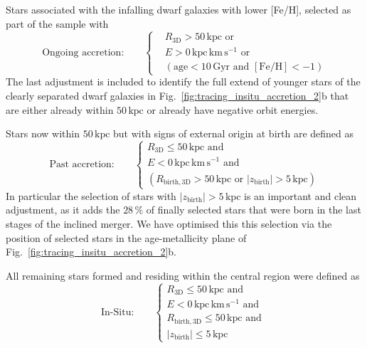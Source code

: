 \documentclass[fleqn,usenatbib]{mnras}
\begin{document}
Stars associated with the infalling dwarf galaxies with lower [Fe/H], selected as part of the sample with
\begin{equation}
\text{Ongoing accretion:} \qquad
\begin{cases}
&R_\mathrm{3D} > 50\,\mathrm{kpc} \text{ or }\\
&E > 0\,\mathrm{kpc\,km\,s^{-1}} \text{ or } \\
&( \mathrm{age} < 10\,\mathrm{Gyr} \text{ and }  [\mathrm{Fe}/\mathrm{H}] < -1 )
\end{cases}
\end{equation}
The last adjustment is included to identify the full extend of younger stars of the clearly separated dwarf galaxies in Fig.~\ref{fig:tracing_insitu_accretion_2}b that are either already within $50\,\mathrm{kpc}$ or already have negative orbit energies.

Stars now within $50\,\mathrm{kpc}$ but with signs of external origin at birth are defined as
\begin{equation} \label{eq:selection_past_accretion}
    \text{Past accretion:} \qquad \begin{cases}
    R_{\mathrm{3D}} \leq 50\,\mathrm{kpc} \text{ and }\\
    E < 0\,\mathrm{kpc\,km\,s^{-1}} \text{ and } \\
    ( R_{\mathrm{birth}, \mathrm{3D}} > 50\,\mathrm{kpc} \text{ or } |z_{\mathrm{birth}}| > 5\,\mathrm{kpc} )
    \end{cases}
\end{equation}
In particular the selection of stars with $|z_{\mathrm{birth}}| > 5\,\mathrm{kpc}$ is an important and clean adjustment, as it adds the $28\,\%$ of finally selected stars that were born in the last stages of the inclined merger. We have optimised this this selection via the position of selected stars in the age-metallicity plane of Fig.~\ref{fig:tracing_insitu_accretion_2}b.

All remaining stars formed and residing within the central region were defined as
\begin{equation} \label{eq:selection_insitu}
\text{In-Situ:} \qquad
\begin{cases} 
    R_{\mathrm{3D}} \leq 50\,\mathrm{kpc} \text{ and }\\
    E < 0\,\mathrm{kpc\,km\,s^{-1}} \text{ and } \\
    R_{\mathrm{birth}, \mathrm{3D}} \leq 50\,\mathrm{kpc} \text{ and }\\
    |z_{\mathrm{birth}}| \leq 5\,\mathrm{kpc}
\end{cases}
\end{equation}
\end{document}

